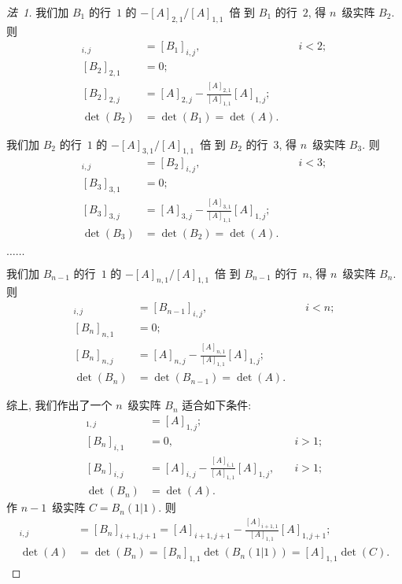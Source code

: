 \begin{proof}[法~1]
    我们加 \(B_1\) 的行~\(1\) 的 \(-[A]_{2,1} / [A]_{1,1}\)~倍%
    到 \(B_1\) 的行~\(2\), 得 \(n\)~级实阵 \(B_2\).
    则
    \begin{align*}
        [B_2]_{i,j}  & = [B_1]_{i,j},
                     & \quad i < 2;                        \\
        [B_2]_{2,1}  & = 0;                                \\
        [B_2]_{2,j}  & =
        [A]_{2,j} - \frac{[A]_{2,1}}{[A]_{1,1}} [A]_{1,j}; \\
        \det {(B_2)} & =
        \det {(B_1)} = \det {(A)}.
    \end{align*}

    我们加 \(B_2\) 的行~\(1\) 的 \(-[A]_{3,1} / [A]_{1,1}\)~倍%
    到 \(B_2\) 的行~\(3\), 得 \(n\)~级实阵 \(B_3\).
    则
    \begin{align*}
        [B_3]_{i,j}  & = [B_2]_{i,j},
                     & \quad i < 3;                        \\
        [B_3]_{3,1}  & = 0;                                \\
        [B_3]_{3,j}  & =
        [A]_{3,j} - \frac{[A]_{3,1}}{[A]_{1,1}} [A]_{1,j}; \\
        \det {(B_3)} & =
        \det {(B_2)} = \det {(A)}.
    \end{align*}

    \(\dots \dots\)

    我们加 \(B_{n-1}\) 的行~\(1\) 的 \(-[A]_{n,1} / [A]_{1,1}\)~倍%
    到 \(B_{n-1}\) 的行~\(n\), 得 \(n\)~级实阵 \(B_n\).
    则
    \begin{align*}
        [B_n]_{i,j}  & = [B_{n-1}]_{i,j},
                     & \quad i < n;                        \\
        [B_n]_{n,1}  & = 0;                                \\
        [B_n]_{n,j}  & =
        [A]_{n,j} - \frac{[A]_{n,1}}{[A]_{1,1}} [A]_{1,j}; \\
        \det {(B_n)} & =
        \det {(B_{n-1})} = \det {(A)}.
    \end{align*}

    综上, 我们作出了一个 \(n\)~级实阵 \(B_n\) 适合如下条件:
    \begin{align*}
        [B_n]_{1,j}  & = [A]_{1,j};                 \\
        [B_n]_{i,1}  & = 0,          & \quad i > 1; \\
        [B_n]_{i,j}  & =
        [A]_{i,j} - \frac{[A]_{i,1}}{[A]_{1,1}} [A]_{1,j},
                     & \quad i > 1;                 \\
        \det {(B_n)} & = \det {(A)}.
    \end{align*}
    作 \(n-1\)~级实阵 \(C = B_n (1|1)\).
    则
    \begin{align*}
        [C]_{i,j}  & = [B_n]_{i+1,j+1}
        = [A]_{i+1,j+1} - \frac{[A]_{i+1,1}}{[A]_{1,1}} [A]_{1,j+1};
        \\
        \det {(A)} & = \det {(B_n)} = [B_n]_{1,1} \det {(B_n (1|1))}
            = [A]_{1,1} \det {(C)}.
    \end{align*}


\end{proof}
